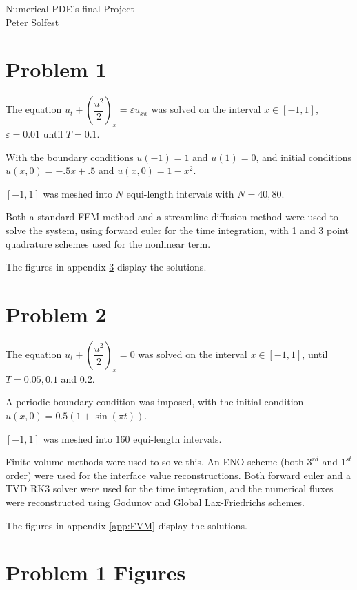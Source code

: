 \documentclass[10pt,letterpaper,fleqn]{article}
\begin{document}
\doublespacing

\begin{flushright}
Numerical PDE's final Project\\
Peter Solfest
\end{flushright}


\section{Problem 1}
The equation $u_t + \left(\dfrac{u^2}{2}\right)_x = \varepsilon u_{xx}$ was solved on the interval $x \in [-1,1]$, $\varepsilon = 0.01$ until $T = 0.1$.

With the boundary conditions $u(-1) = 1$ and $u(1) = 0$, and initial conditions $u(x,0) = -.5x + .5$ and $u(x,0) = 1 - x^2$.

$[-1,1]$ was meshed into $N$ equi-length intervals with $N = 40,80$.

Both a standard FEM method and a streamline diffusion method were used
to solve the system, using forward euler for the time integration,
with 1 and 3 point quadrature schemes used for the nonlinear term.

The figures in appendix \ref{app:FEM} display the solutions.

\section{Problem 2}
The equation $u_t + \left(\dfrac{u^2}{2}\right)_x = 0$ was solved on the interval $x \in [-1,1]$, until $T = 0.05, 0.1$ and $0.2$.

A periodic boundary condition was imposed, with the initial condition
$u(x,0) = 0.5 (1 + \sin(\pi t))$.

$[-1,1]$ was meshed into $160$ equi-length intervals.

Finite volume methods were used to solve this.
An ENO scheme (both $3^{rd}$ and $1^{st}$ order) were used for
the interface value reconstructions.
Both forward euler and a TVD RK3 solver were used for the time integration,
and the numerical fluxes were reconstructed using Godunov and Global Lax-Friedrichs schemes.

The figures in appendix \ref{app:FVM} display the solutions.


\appendix
\section{Problem 1 Figures}\label{app:FEM}
\end{document}
